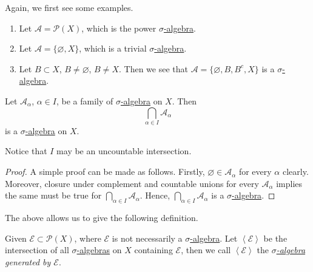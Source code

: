 \begin{eg}
	Again, we first see some examples.
	\begin{enumerate}
		\item Let \(\mathcal{A} = \mathcal{P} (X)\), which is the power \hyperref[def:sigma-algebra]{\(\sigma\)-algebra}.
		\item Let \(\mathcal{A} = \{\varnothing , X\}\), which is a trivial \hyperref[def:sigma-algebra]{\(\sigma\)-algebra}.
		\item Let \(B\subset X\), \(B\neq \varnothing \), \(B\neq X\). Then we see that \(\mathcal{A} = \{\varnothing , B, B^{c}, X\}\) is a \hyperref[def:sigma-algebra]{\(\sigma\)-algebra}.
	\end{enumerate}
\end{eg}

\begin{lemma}
	Let \(\mathcal{A}_{\alpha}\), \(\alpha\in I\), be a family of \hyperref[def:sigma-algebra]{\(\sigma\)-algebra} on \(X\). Then
	\[
		\bigcap\limits_{\alpha\in I} \mathcal{A}_{\alpha}
	\]
	is a \hyperref[def:sigma-algebra]{\(\sigma\)-algebra} on \(X\).
\end{lemma}
\begin{remark}
	Notice that \(I\) may be an uncountable intersection.
\end{remark}
\begin{proof}
	A simple proof can be made as follows. Firstly, \(\varnothing \in \mathcal{A}_{\alpha}\) for every \(\alpha\) clearly.
	Moreover, closure under complement and countable unions for every \(\mathcal{A}_{\alpha}\) implies the same must be true for \(\bigcap\limits_{\alpha\in I} \mathcal{A}_{\alpha}\).
	Hence, \(\bigcap\limits_{\alpha\in I} \mathcal{A}_{\alpha}\) is a \hyperref[def:sigma-algebra]{\(\sigma\)-algebra}.
\end{proof}

The above allows us to give the following definition.
\begin{definition}
	Given \(\mathcal{E} \subset \mathcal{P} (X) \), where \(\mathcal{E}\) is not necessarily a \hyperref[def:sigma-algebra]{\(\sigma\)-algebra}. Let
	\(\left<\mathcal{E}\right>\) be the intersection of all \hyperref[def:sigma-algebra]{\(\sigma\)-algebras} on \(X\) containing \(\mathcal{E}\), then
	we call \(\left<\mathcal{E} \right>\) the \emph{\hyperref[def:sigma-algebra]{\(\sigma\)-algebra} generated by \(\mathcal{E}\)}.
\end{definition}

